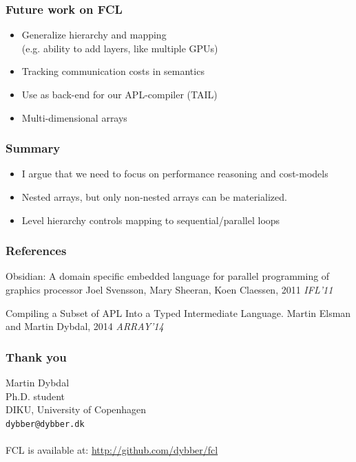 \documentclass{beamer}
\begin{document}
\begin{frame}
  \frametitle{Future work on FCL}
  \begin{itemize}
  \item Generalize hierarchy and mapping \\
    {\small (e.g. ability to add layers, like multiple GPUs)}
  \item Tracking communication costs in semantics
  \item Use as back-end for our APL-compiler (TAIL)
  \item Multi-dimensional arrays
  \end{itemize}
\end{frame}

\begin{frame}
\frametitle{Summary}

\begin{itemize}
\item I argue that we need to focus on performance reasoning and
  cost-models
\item Nested arrays, but only non-nested arrays can be materialized.
\item Level hierarchy controls mapping to sequential/parallel loops
\end{itemize}

\end{frame}

\begin{frame}
\frametitle{References}
\footnotesize{
\begin{thebibliography}{99} %
 Obsidian: A domain specific embedded language for parallel programming of graphics processor
\newblock Joel Svensson, Mary Sheeran, Koen Claessen, 2011
\newblock \emph{IFL'11}

 Compiling a Subset of APL Into a Typed Intermediate Language.
\newblock Martin Elsman and Martin Dybdal, 2014
\newblock \emph{ARRAY'14}
\end{thebibliography}
}
\end{frame}

\begin{frame}
\frametitle{Thank you}

Martin Dybdal \\
Ph.D. student \\
DIKU, University of Copenhagen \\
\texttt{dybber@dybber.dk} \\
~\\
FCL is available at: \url{http://github.com/dybber/fcl}
\end{frame}
\end{document}
